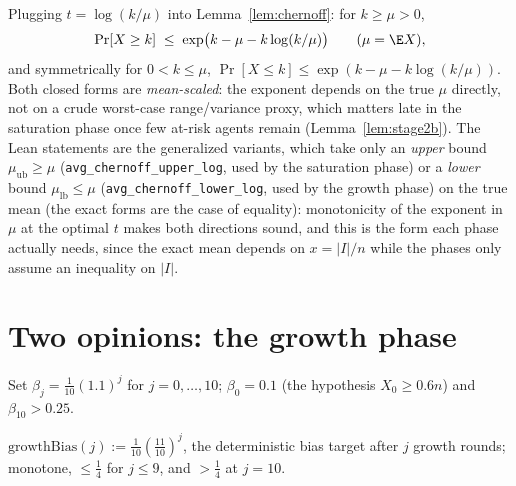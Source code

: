 \begin{lemma}\label{lem:chernofflog}
  \leanok
  Plugging $t=\log(k/\mu)$ into Lemma~\ref{lem:chernoff}: for $k\ge\mu>0$,
  \[
    \Pr[X\ge k] \;\le\; \exp\bigl(k-\mu-k\log(k/\mu)\bigr)
    \qquad(\mu=\E X),
  \]
  and symmetrically for $0<k\le\mu$,
  $\Pr[X\le k] \le \exp(k-\mu-k\log(k/\mu))$.
  Both closed forms are \emph{mean-scaled}: the exponent depends on the true
  $\mu$ directly, not on a crude worst-case range/variance proxy, which
  matters late in the saturation phase once few at-risk agents remain
  (Lemma~\ref{lem:stage2b}). The Lean statements are the generalized
  variants, which take only an \emph{upper} bound $\mu_{\mathrm{ub}}\ge\mu$
  (\texttt{avg\_chernoff\_upper\_log}, used by the saturation phase) or a
  \emph{lower} bound $\mu_{\mathrm{lb}}\le\mu$ (\texttt{avg\_chernoff\_lower\_log}, used by
  the growth phase) on the true mean (the exact forms are the case of equality): monotonicity of the exponent in $\mu$ at the optimal $t$
  makes both directions sound, and this is the form each phase actually
  needs, since the exact mean depends on $x=|I|/n$ while the phases only
  assume an inequality on $|I|$.
\end{lemma}

\section{Two opinions: the growth phase}\label{sec:growth}

Set $\beta_j = \tfrac1{10}(1.1)^j$ for $j=0,\dots,10$; $\beta_0=0.1$ (the
hypothesis $X_0\ge0.6n$) and $\beta_{10}>0.25$.

\begin{definition}\label{def:growthbias}
  \leanok
  $\mathrm{growthBias}(j) := \tfrac1{10}(\tfrac{11}{10})^j$, the deterministic
  bias target after $j$ growth rounds; monotone, $\le\tfrac14$ for $j\le9$,
  and $>\tfrac14$ at $j=10$.
\end{definition}


